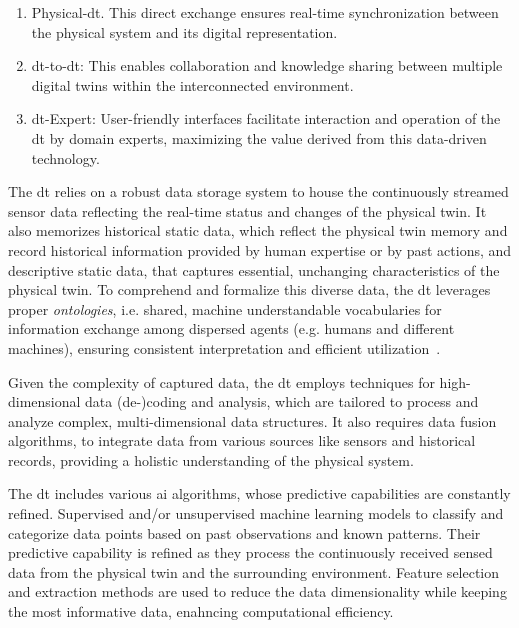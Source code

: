     \begin{enumerate}
        \item Physical-\acrshort{dt}. This direct exchange ensures real-time synchronization between the physical system and its digital representation.
        \item \acrshort{dt}-to-\acrshort{dt}: This enables collaboration and knowledge sharing between multiple digital twins within the interconnected environment.
        \item \acrshort{dt}-Expert: User-friendly interfaces facilitate interaction and operation of the \acrshort{dt} by domain experts, maximizing the value derived from this data-driven technology.
    \end{enumerate}

    The \acrshort{dt} relies on a robust data storage system to house the continuously streamed sensor data reflecting the real-time status and changes of the physical twin.
    It also memorizes historical static data, which reflect the physical twin memory and record historical information provided by human expertise or by past actions, and descriptive static data, that captures essential, unchanging characteristics of the physical twin. To comprehend and formalize this diverse data, the \acrshort{dt} leverages proper \textit{ontologies}, i.e. shared, machine understandable vocabularies for information exchange among dispersed agents (e.g. humans and different machines), ensuring consistent interpretation and efficient utilization~\parencite{negriReviewRolesDigital2017}.

    Given the complexity of captured data, the \acrshort{dt} employs techniques for high-dimensional data (de-)coding and analysis, which are tailored to process and analyze complex, multi-dimensional data structures. It also requires data fusion algorithms, to integrate data from various sources like sensors and historical records, providing a holistic understanding of the physical system.

    The \acrshort{dt} includes various \acrshort{ai} algorithms, whose predictive capabilities are constantly refined. Supervised and/or unsupervised machine learning models to classify and categorize data points based on past observations and known patterns. Their predictive capability is refined as they process the continuously received sensed data from the physical twin and the surrounding environment. Feature selection and extraction methods are used to reduce the data dimensionality while keeping the most informative data, enahncing computational efficiency.

